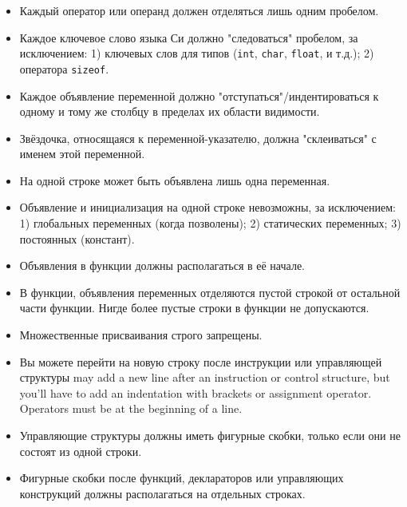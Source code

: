 \documentclass{42-ru}
\begin{document}
\begin{itemize}
                \item Каждый оператор или операнд должен отделяться лишь одним пробелом.

                \item Каждое ключевое слово языка Си должно "следоваться" пробелом, за исключением: 1) ключевых слов для типов (\texttt{int}, \texttt{char}, \texttt{float}, и т.д.); 2) оператора \texttt{sizeof}.

                \item Каждое объявление переменной должно "отступаться"/индентироваться к одному и тому же столбцу в пределах их области видимости.

                \item Звёздочка, относящаяся к переменной-указателю, должна "склеиваться" с именем этой переменной.

                \item На одной строке может быть объявлена лишь одна переменная.

                \item Объявление и инициализация на одной строке невозможны, за исключением: 1) глобальных переменных (когда позволены); 2) статических переменных; 3) постоянных (констант).

                \item Объявления в функции должны располагаться в её начале.

                \item В функции, объявления переменных отделяются пустой строкой от остальной части функции. Нигде более пустые строки в функции не допускаются.

                \item Множественные присваивания строго запрещены.

                \item Вы можете перейти на новую строку после инструкции или управляющей структуры may add a new line after an instruction or
                  control structure, but you'll have to add an
                  indentation with brackets or assignment operator.
                  Operators must be at the beginning of a line.

                \item Управляющие структуры должны иметь фигурные скобки, только если они не состоят из одной строки.

                \item Фигурные скобки после функций, деклараторов или управляющих конструкций должны располагаться на отдельных строках.

            \end{itemize}
\end{document}
